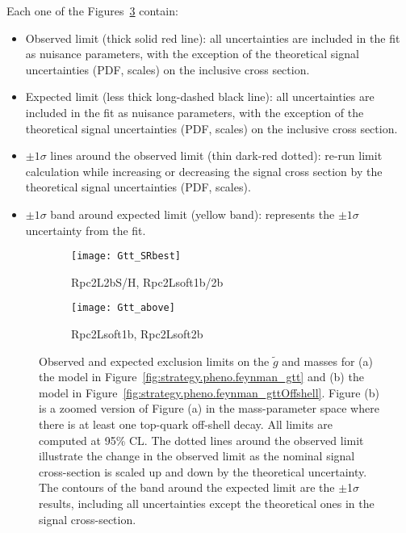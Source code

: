 Each one of the Figures~\ref{fig:Results_Limits_RPC} contain:
\begin{itemize}
\item Observed limit (thick solid red line): all uncertainties are included in the fit as nuisance 
parameters, with the exception of the theoretical signal uncertainties (PDF, scales) on the 
inclusive cross section.
\item Expected limit (less thick long-dashed black line): all uncertainties are included in the fit 
as nuisance parameters, with the exception of the theoretical signal uncertainties (PDF, scales) 
on the inclusive cross section. 
\item $\pm 1\sigma$ lines around the observed limit (thin dark-red dotted): re-run limit calculation
 while increasing or decreasing the signal cross section by the theoretical signal uncertainties 
  (PDF, scales).
\item $\pm 1\sigma$  band around expected limit (yellow band): represents the  $\pm 1\sigma$ 
uncertainty from the fit.
\end{itemize}

\begin{figure}[p]
\centering
\begin{subfigure}[t]{0.45\textwidth}\texttt{[image: Gtt\_SRbest]}\caption{Rpc2L2bS/H, Rpc2Lsoft1b/2b}\label{fig:limits_feynman_gtt}\end{subfigure}
\begin{subfigure}[t]{0.45\textwidth}\texttt{[image: Gtt\_above]}\caption{Rpc2Lsoft1b, Rpc2Lsoft2b}\label{fig:limits_feynman_gttOffshell}\end{subfigure}
\caption{Observed and expected exclusion limits on the $\tilde{g}$ and \ninoone masses for (a) the model in Figure~\ref{fig:strategy.pheno.feynman_gtt} 
and (b) the model in Figure~\ref{fig:strategy.pheno.feynman_gttOffshell}. 
Figure (b) is a zoomed version of Figure (a) in the mass-parameter space where there is at least one top-quark off-shell decay.
All limits are computed at 95\% CL. The dotted lines around the observed
limit illustrate the change in the observed limit as the nominal signal cross-section is scaled up and down
by the theoretical uncertainty. The contours of the band around the expected 
limit are the $\pm$1$\sigma$ results, 
including all uncertainties except the theoretical ones in the signal cross-section. 
}
\label{fig:Results_Limits_RPC} 
\end{figure} 


